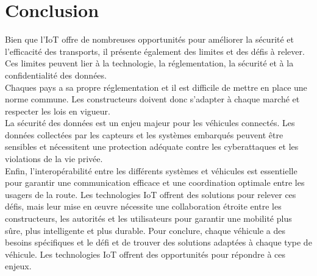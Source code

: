 \documentclass{article}
\begin{document}
\section{Conclusion}
Bien que l’IoT offre de nombreuses opportunités pour améliorer la sécurité et l’efficacité des transports, il présente également des limites et des défis à relever. Ces limites peuvent lier à la technologie, la réglementation, la sécurité et à la confidentialité des données.\\
Chaques pays a sa propre réglementation et il est difficile de mettre en place une norme commune. Les constructeurs doivent donc s'adapter à chaque marché et respecter les lois en vigueur.\\
La sécurité des données est un enjeu majeur pour les véhicules connectés. Les données collectées par les capteurs et les systèmes embarqués peuvent être sensibles et nécessitent une protection adéquate contre les cyberattaques et les violations de la vie privée.\\
Enfin, l'interopérabilité entre les différents systèmes et véhicules est essentielle pour garantir une communication efficace et une coordination optimale entre les usagers de la route. Les technologies IoT offrent des solutions pour relever ces défis, mais leur mise en œuvre nécessite une collaboration étroite entre les constructeurs, les autorités et les utilisateurs pour garantir une mobilité plus sûre, plus intelligente et plus durable.
Pour conclure, chaque véhicule a des besoins spécifiques et le défi et de trouver des solutions adaptées à chaque type de véhicule. Les technologies IoT offrent des opportunités pour répondre à ces enjeux.\\


\newpage
\printbibliography
\end{document}
